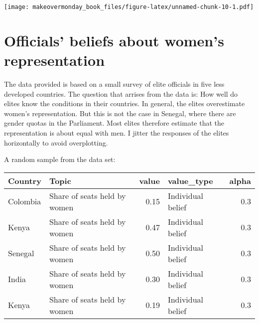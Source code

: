 \documentclass[]{book}
\theoremstyle{definition}
\theoremstyle{definition}
\theoremstyle{definition}
\theoremstyle{remark}
\begin{document}
\texttt{[image: makeovermonday\_book\_files/figure-latex/unnamed-chunk-10-1.pdf]}

\chapter{Officials' beliefs about women's
representation}\label{officials-beliefs-about-womens-representation}

The data provided is based on a small survey of elite officials in five
less developed countries. The question that arrises from the data is:
How well do elites know the conditions in their countries. In general,
the elites overestimate women's representation. But this is not the case
in Senegal, where there are gender quotas in the Parliament. Most elites
therefore estimate that the representation is about equal with men. I
jitter the responses of the elites horizontally to avoid overplotting.

A random sample from the data set:

\begin{tabular}{l|l|r|l|r}
\hline
Country & Topic & value & value\_type & alpha\\
\hline
Colombia & Share of seats held by women & 0.15 & Individual belief & 0.3\\
\hline
Kenya & Share of seats held by women & 0.47 & Individual belief & 0.3\\
\hline
Senegal & Share of seats held by women & 0.50 & Individual belief & 0.3\\
\hline
India & Share of seats held by women & 0.30 & Individual belief & 0.3\\
\hline
Kenya & Share of seats held by women & 0.19 & Individual belief & 0.3\\
\hline
\end{tabular}
\end{document}
